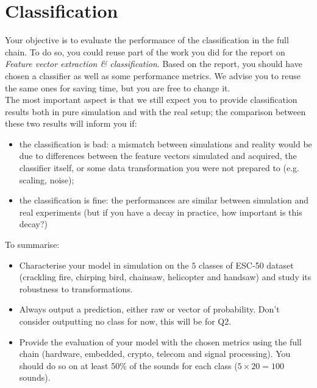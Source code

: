 \section{Classification}

Your objective is to evaluate the performance of the classification in the full chain. To do so, you could reuse part of the work you did for
the report on \emph{Feature vector extraction \& classification}.
Based on the report, you should have chosen a classifier as well as some performance metrics.
We advise you to reuse the same ones for saving time, but you are free to change it.  \\
The most important aspect is that we still expect you to provide classification results both in pure simulation and with the real setup; the comparison between these two results will inform you if:
\begin{itemize}
    \item the classification is bad: a mismatch between simulations and reality would be due to differences between the feature vectors simulated and acquired, the classifier itself, or some data transformation you were not prepared to (e.g. scaling, noise);
    \item the classification is fine: the performances are similar between simulation and real experiments (but if you have a decay in practice, how important is this decay?)
\end{itemize}

To summarise:
\begin{itemize}
    \item Characterise your model in simulation on the $5$ classes of ESC-50 dataset (crackling fire, chirping bird, chainsaw, helicopter and handsaw) and study its robustness to transformations.
    \item Always output a prediction, either raw or vector of probability. Don't consider outputting no class for now, this will be for Q2.
    \item Provide the evaluation of your model with the chosen metrics using the full chain (hardware, embedded, crypto, telecom and signal processing). You should do so on at least 50\% of the sounds for each class ($5 \times 20=100$ sounds).
\end{itemize}

